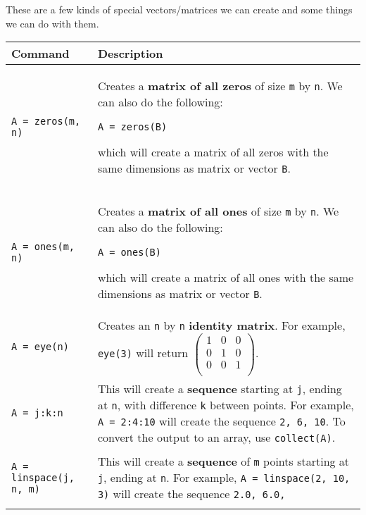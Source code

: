 \documentclass[]{article}
\begin{document}
These are a few kinds of special vectors/matrices we can create and some things we can do with them.
\begin{longtable}{ |m{6cm}  | m{11cm} |}
	\hline
	\textbf{Command} & \textbf{Description}
	\\\hline
	\begin{verbatim}
A = zeros(m, n)
\end{verbatim}
& Creates a \textbf{matrix of all zeros} of size \texttt{m} by \texttt{n}. We can also
do the following:
\begin{verbatim}
A = zeros(B)
\end{verbatim}
which will create a matrix of all zeros with the same dimensions as
matrix or vector \texttt{B}. 
\\\hline
\begin{verbatim}
A = ones(m, n)
\end{verbatim}
& Creates a \textbf{matrix of all ones} of size \texttt{m} by \texttt{n}. We can also
do the following:
\begin{verbatim}
A = ones(B)
\end{verbatim}
which will create a matrix of all ones with the same dimensions as
matrix or vector \texttt{B}. 
\\\hline
\begin{verbatim}
A = eye(n)
\end{verbatim}
& Creates an \texttt{n} by \texttt{n} \textbf{identity matrix}. For example,
\texttt{eye(3)} will return
$\begin{pmatrix}
1 & 0 & 0\\
0 & 1 & 0\\
0 & 0 & 1\\
\end{pmatrix}$.
\\\hline
\begin{verbatim}
A = j:k:n
\end{verbatim}
	& This will create a \textbf{sequence} starting at \texttt{j}, ending at
    \texttt{n}, with difference \texttt{k} between points. For example,
    \texttt{A = 2:4:10} will create the sequence \texttt{2, 6, 10}. To convert the 
    output to an array, use \texttt{collect(A)}.	
    \\\hline
\begin{verbatim}
A = linspace(j, n, m)
\end{verbatim}
	& This will create a \textbf{sequence} of \texttt{m} points starting at \texttt{j}, ending at
    \texttt{n}. For example,
    \texttt{A = linspace(2, 10, 3)} will create the sequence \texttt{2.0, 6.0,
}
\end{longtable}
\end{document}
